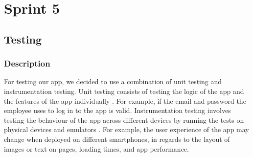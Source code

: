 \section{Sprint 5}
\label{sec:Testing}
\subsection{Testing}
\subsubsection{Description}  
For testing our app, we decided to use a combination of unit testing and instrumentation testing. Unit testing consists of testing the logic of the app and the features of the app individually \cite{unittest}. For example, if the email and password the employee uses to log in to the app is valid. Instrumentation testing involves testing the behaviour of the app across different devices by running the tests on physical devices and emulators \cite{instrumentationtest}. For example, the user experience of the app may change when deployed on different smartphones, in regards to the layout of images or text on pages, loading times, and app performance.
\\

